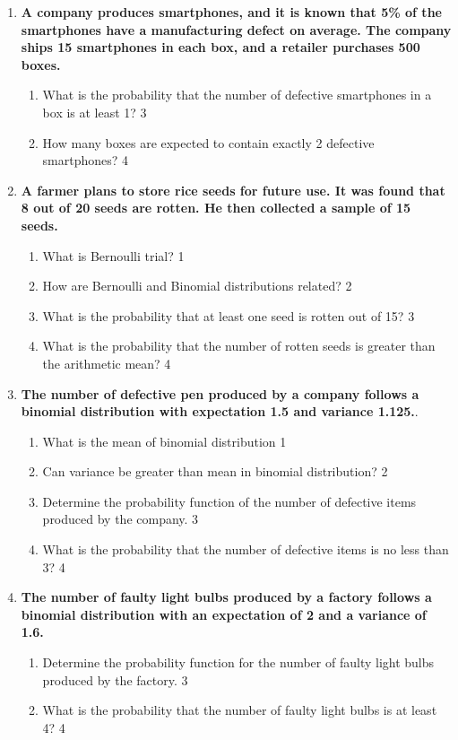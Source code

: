 \documentclass[a4paper,oneside, margin=1.4in]{book}
\begin{document}
\begin{enumerate}
  
  \item
	  \textbf{A company produces smartphones, and it is known that 5\% of the 
	  smartphones have a manufacturing defect on average. The company ships 15 
	  smartphones in each box, and a retailer purchases 500 boxes.} 
  
  \begin{enumerate}
    \item  
	What is the probability that the number of defective smartphones in a box 
	is at least 1? \hfill 3
    \item
	How many boxes are expected to contain exactly 2 defective smartphones? \hfill 4
  \end{enumerate}

  
 \item
	  \textbf{A farmer plans to store rice seeds for future use. It was found 
	  that 8 out of 20 seeds are rotten. He then collected a sample of 15 seeds.} 
  
  \begin{enumerate}
    \item
	What is Bernoulli trial? \hfill 1
    \item
	How are Bernoulli and Binomial distributions related? \hfill 2
    \item  
	What is the probability that at least one seed is rotten out of 15? \hfill 3
    \item
	What is the probability that the number of rotten seeds is greater than the arithmetic mean? \hfill 4
  \end{enumerate}

 \item
	  \textbf{The number of defective pen produced by a company follows a 
	  binomial distribution with expectation 1.5 and variance 1.125.}. 
  
  \begin{enumerate}
    \item
	What is the mean of binomial distribution \hfill 1
    \item
	Can variance be greater than mean in binomial distribution? \hfill 2
    \item  
	Determine the probability function of the number of defective items 
	produced by the company. \hfill 3
    \item
	What is the probability that the number of defective items is no
	less than 3? \hfill 4
  \end{enumerate}
  \item
	  \textbf{The number of faulty light bulbs produced by a factory 
	  follows a binomial distribution with an expectation of 2 and a 
	  variance of 1.6.} 
  
  \begin{enumerate}
    \item  
	Determine the probability function for the number of faulty light 
	bulbs produced by the factory. \hfill 3
    \item
	What is the probability that the number of faulty light bulbs is 
	at least 4? \hfill 4
  \end{enumerate}

  
  \end{enumerate}
\end{document}
